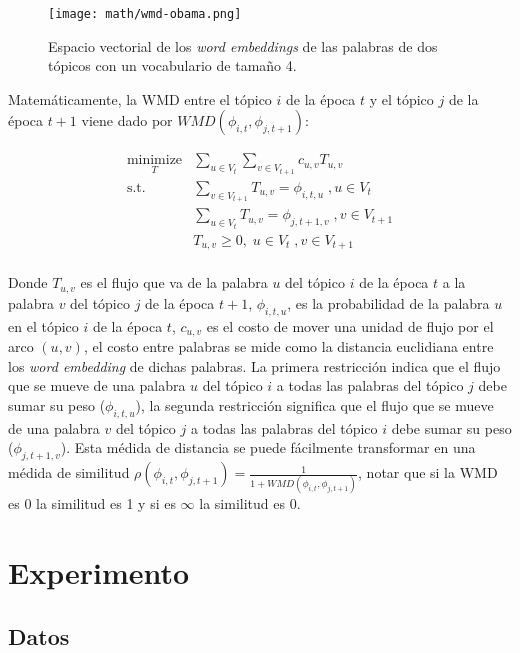 \documentclass[letterpaper,12pt,oneside]{book} %
\begin{document}
\begin{figure}
    \centering
\texttt{[image: math/wmd-obama.png]}
    \caption{Espacio vectorial de los \textit{word embeddings} de las palabras de dos tópicos con un vocabulario de tamaño 4.}
    \label{img:wmd_obama}
\end{figure}

Matemáticamente, la WMD entre el tópico $i$ de la época $t$ y el tópico $j$ de la época $t+1$ viene dado por $WMD(\phi_{i,t}, \phi_{j,t+1})$:

\begin{align}
\nonumber
\underset{T}{\text{minimize}}&\sum_{u \in V_{t}}\sum_{v \in V_{t+1}} c_{u,v}T_{u,v} \\ \nonumber
\textrm{s.t.}\qquad &\sum_{v \in V_{t+1}}T_{u,v}= \phi_{i,t,u} \;, u \in V_{t}\\ \nonumber
& \sum_{u \in V_{t}}T_{u,v}= \phi_{j,t+1,v} \;, v\in V_{t+1}\\ \nonumber
& T_{u,v} \geq 0,\; u \in V_{t} \;, v \in V_{t+1}\\ \nonumber
\end{align}


Donde $T_{u,v}$ es el flujo que va de la palabra $u$ del tópico $i$ de la época $t$ a la palabra $v$ del tópico $j$ de la época $t+1$, $\phi_{i,t,u}$, es la probabilidad de la palabra $u$ en el tópico $i$ de la época $t$, $c_{u,v}$ es el costo de mover una unidad de flujo por el arco $(u,v)$, el costo entre palabras se mide como la distancia euclidiana entre los \textit{word embedding} de dichas palabras. La primera restricción indica que el flujo que se mueve de una palabra $u$ del tópico $i$ a todas las palabras del tópico $j$ debe sumar su peso ($\phi_{i,t,u}$), la segunda restricción significa que el flujo que se mueve de una palabra $v$ del tópico $j$ a todas las palabras del tópico $i$ debe sumar su peso ($\phi_{j,t+1,v}$). Esta médida de distancia se puede fácilmente transformar en una médida de similitud $\rho(\phi_{i,t}, \phi_{j,t+1}) = \frac{1}{1+WMD(\phi_{i,t}, \phi_{j,t+1})}$, notar que si la WMD es 0 la similitud es 1 y si es $\infty$ la similitud es 0.



\chapter{Experimento}

\section{Datos}
\end{document}
